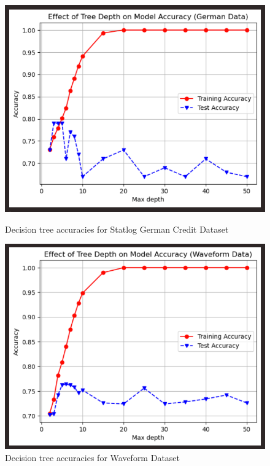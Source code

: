\documentclass{article}
\begin{document}
    \begin{figure}[H]
        \centering
        \begin{minipage}[t]{0.47\textwidth}
            \centering
            \includegraphics[width=\textwidth, height=0.30\textheight]{3a.png}
            \caption{Decision tree accuracies for Statlog German Credit Dataset}
        \end{minipage}
        \hfill
        \begin{minipage}[t]{0.47\textwidth}
            \centering
            \includegraphics[width=\textwidth, height=0.30\textheight]{3b.png}
            \caption{Decision tree accuracies for Waveform Dataset}
        \end{minipage}
    \end{figure}
\end{document}
